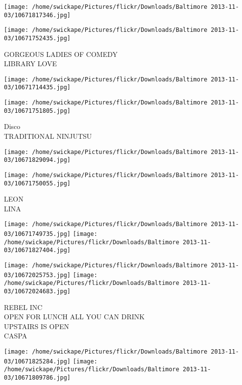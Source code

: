 \documentclass[10pt,letterpaper]{article}
\begin{document}
\texttt{[image: /home/swickape/Pictures/flickr/Downloads/Baltimore 2013-11-03/10671817346.jpg]}

\vspace{0.25in}
\texttt{[image: /home/swickape/Pictures/flickr/Downloads/Baltimore 2013-11-03/10671752435.jpg]}

GORGEOUS LADIES OF COMEDY\\
LIBRARY LOVE\\
\pagebreak

\texttt{[image: /home/swickape/Pictures/flickr/Downloads/Baltimore 2013-11-03/10671714435.jpg]}

\vspace{0.25in}
\texttt{[image: /home/swickape/Pictures/flickr/Downloads/Baltimore 2013-11-03/10671751805.jpg]}

Disco\\
TRADITIONAL NINJUTSU\\
\pagebreak

\texttt{[image: /home/swickape/Pictures/flickr/Downloads/Baltimore 2013-11-03/10671829094.jpg]}

\vspace{0.25in}
\texttt{[image: /home/swickape/Pictures/flickr/Downloads/Baltimore 2013-11-03/10671750055.jpg]}

LEON\\
LINA\\
\pagebreak

\texttt{[image: /home/swickape/Pictures/flickr/Downloads/Baltimore 2013-11-03/10671749735.jpg]}
\texttt{[image: /home/swickape/Pictures/flickr/Downloads/Baltimore 2013-11-03/10671827404.jpg]}

\texttt{[image: /home/swickape/Pictures/flickr/Downloads/Baltimore 2013-11-03/10672025753.jpg]}
\texttt{[image: /home/swickape/Pictures/flickr/Downloads/Baltimore 2013-11-03/10672024683.jpg]}

REBEL INC\\
OPEN FOR LUNCH ALL YOU CAN DRINK\\
UPSTAIRS IS OPEN\\
CASPA\\
\pagebreak

\texttt{[image: /home/swickape/Pictures/flickr/Downloads/Baltimore 2013-11-03/10671825284.jpg]}
\texttt{[image: /home/swickape/Pictures/flickr/Downloads/Baltimore 2013-11-03/10671809786.jpg]}
\end{document}
